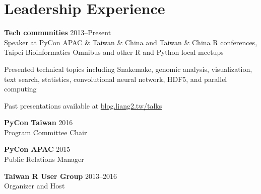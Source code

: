 \section{Leadership Experience}

\begin{entrylist}

\item \textbf{Tech communities} \hfill 2013--Present\\
    Speaker at PyCon APAC \& Taiwan \& China and Taiwan \& China R conferences, Taipei Bioinformatics Omnibus and other R and Python local meetups
    \begin{detaillist}
        \item Presented technical topics including Snakemake, genomic analysis, visualization, text search, statistics, convolutional neural network, HDF5, and parallel computing
        \item Past presentations available at \href{https://blog.liang2.tw/talks/}{blog.liang2.tw/talks}
    \end{detaillist}

\item \normalsize \textbf{PyCon Taiwan} \hfill 2016\\
    Program Committee Chair

\item \textbf{PyCon APAC} \hfill 2015\\
    Public Relations Manager

\item \textbf{Taiwan R User Group} \hfill 2013--2016\\
    Organizer and Host
\end{entrylist}
